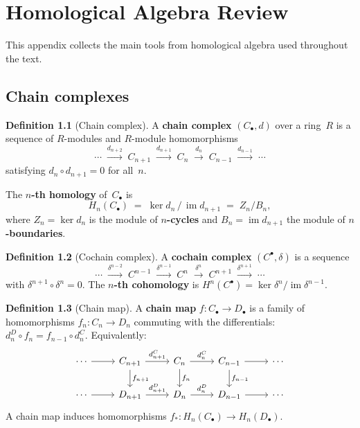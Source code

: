 \documentclass[12pt,a4paper,openany]{book}
\theoremstyle{definition}
\newtheorem{definition}{Definition}[chapter]
\theoremstyle{plain}
\theoremstyle{remark}
\DeclareMathOperator{\im}{im}
\begin{document}
\appendix

\chapter{Homological Algebra Review}\label{app:homological-algebra}
\minitoc\bigskip

This appendix collects the main tools from homological algebra used
throughout the text.

\section{Chain complexes}\label{sec:chain-complexes}

\begin{definition}[Chain complex]
A \textbf{chain complex} $(C_\bullet,d)$ over a ring~$R$ is a sequence
of $R$-modules and $R$-module homomorphisms
\[
  \cdots \;\xrightarrow{d_{n+2}}\;
  C_{n+1} \;\xrightarrow{d_{n+1}}\;
  C_n \;\xrightarrow{d_n}\;
  C_{n-1} \;\xrightarrow{d_{n-1}}\;
  \cdots
\]
satisfying $d_n\circ d_{n+1}=0$ for all~$n$.

The \textbf{$n$-th homology} of~$C_\bullet$ is
\[
  H_n(C_\bullet)
  \;=\;
  \ker d_n\,/\,\im d_{n+1}
  \;=\;
  Z_n/B_n,
\]
where $Z_n=\ker d_n$ is the module of \textbf{$n$-cycles}
and $B_n=\im d_{n+1}$ the module of
\textbf{$n$-boundaries}.
\end{definition}

\begin{definition}[Cochain complex]
A \textbf{cochain complex} $(C^\bullet,\delta)$ is a sequence
\[
  \cdots \;\xrightarrow{\delta^{n-2}}\;
  C^{n-1} \;\xrightarrow{\delta^{n-1}}\;
  C^n \;\xrightarrow{\delta^n}\;
  C^{n+1} \;\xrightarrow{\delta^{n+1}}\;
  \cdots
\]
with $\delta^{n+1}\circ\delta^n=0$.  The \textbf{$n$-th cohomology}
is $H^n(C^\bullet)=\ker\delta^n/\im\delta^{n-1}$.
\end{definition}

\begin{definition}[Chain map]
A \textbf{chain map} $f\colon C_\bullet\to D_\bullet$ is a family of
homomorphisms $f_n\colon C_n\to D_n$ commuting with the
differentials: $d_n^D\circ f_n = f_{n-1}\circ d_n^C$.  Equivalently:
\[
\begin{tikzcd}
  \cdots \ar[r] & C_{n+1} \ar[r,"d_{n+1}^C"]\ar[d,"f_{n+1}"]
  & C_n \ar[r,"d_n^C"]\ar[d,"f_n"]
  & C_{n-1} \ar[r]\ar[d,"f_{n-1}"] & \cdots \\
  \cdots \ar[r] & D_{n+1} \ar[r,"d_{n+1}^D"]
  & D_n \ar[r,"d_n^D"]
  & D_{n-1} \ar[r] & \cdots
\end{tikzcd}
\]
A chain map induces homomorphisms
$f_*\colon H_n(C_\bullet)\to H_n(D_\bullet)$.
\end{definition}
\end{document}
